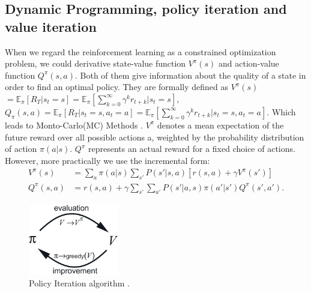 \subsection{Dynamic Programming, policy iteration and value iteration}
When we regard the reinforcement learning as a constrained optimization problem, we could derivative state-value function $V^{\pi}(s)$ and action-value function $Q^{\pi}(s, a)$\cite{gordon1999approximate}\cite{puterman2014markov}. Both of them give information about the quality of a state in order to find an optimal policy. They are formally defined as 
$V^\pi (s)$  $ = \mathbb{E}_\pi [ R_T \vert s_t = s] = \mathbb{E}_\pi [ {\sum_{k=0}^{\infty}\gamma^k r_{t+k} \vert s_t = s} ] \label{equ:origin:V}$, 
$Q_\pi(s, a) = \mathbb{E}_\pi [R_T \vert s_t = s, a_t = a] =  \mathbb{E}_\pi [ {\sum_{k=0}^{\infty}\gamma^k r_{t+k} \vert s_t = s, a_t = a} ] \label{equ:origin:Q}
$. Which leads to Monto-Carlo(MC) Methods \cite{boyan1999least}. 
$V^\pi$ denotes a mean expectation of the future reward over all possible actions a, weighted by the probability distribution of action $\pi(a|s)$. $Q^\pi$
represents an actual reward for a fixed choice of actions.
However, more practically we use the incremental form: 
\begin{align}
V^\pi(s) &= \sum_a \pi(a \vert s) \sum_{s'} P(s' \vert s, a) [r(s, a) + \gamma V^{\pi}(s')] \label{equ:V} \\
Q^\pi(s, a) &= r(s, a) + \gamma \sum_{s'} \sum_{a'} P(s' \vert a, s) \pi(a' \vert s') Q^\pi(s', a'). \label{equ:Q}
\end{align} 
\begin{figure}	
	\centering
	\vspace{-15pt}
	\includegraphics[width=0.35\textwidth]{pic/PI}
	\vspace{-15pt}
	\caption{Policy Iteration algorithm  \cite{sutton1998introduction}.}
	\vspace{ -15pt}
	\label{fig:PI}
\end{figure}
